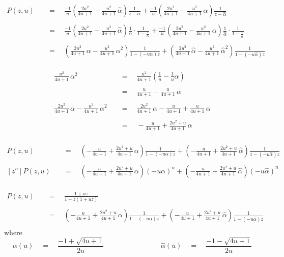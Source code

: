 \documentclass[twoside]{article}
\newcommand{\equals}{\ensuremath{\quad =\quad}}
\newcommand{\fourqquad}{\ensuremath{\qquad\qquad\qquad\qquad}}
\newcommand{\alphahat}{\ensuremath{\hat{\alpha}}}
\begin{document}
\begin{align*}
P(z,u)	& \equals \frac{-1}{u}\left(\frac{2u^2}{4u+1}-\frac{u^2}{4u+1}\,\alphahat\right)\frac{1}{z-\alpha}
                  +\frac{-1}{u}\left(\frac{2u^2}{4u+1}-\frac{u^2}{4u+1}\,\alpha\right)\frac{1}{z-\alphahat}				\\
																	\\
	& \equals \frac{-1}{u}\left(\frac{2u^2}{4u+1}-\frac{u^2}{4u+1}\,\alphahat\right)\frac{1}{\alpha}
                  \cdot \frac{1}{1-\frac{z}{\alpha}}
                  +\frac{-1}{u}\left(\frac{2u^2}{4u+1}-\frac{u^2}{4u+1}\,\alpha\right)\frac{1}{\alphahat}
                  \cdot \frac{1}{1-\frac{z}{\alphahat}}											\\
																	\\
	& \equals \left(\frac{2u^2}{4u+1}\,\alpha-\frac{u^2}{4u+1}\,\alpha^2\right) \frac{1}{1-(-u\alpha)z}
                  +\left(\frac{2u^2}{4u+1}\,\alphahat-\frac{u^2}{4u+1}\,\alphahat^2\right) \frac{1}{1-(-u\alphahat)z}		\\
\end{align*}

\begin{align*}
\frac{u^2}{4u+1}\,\alpha^2				& \equals \frac{u^2}{4u+1}\left(\frac{1}{u}-\frac{1}{u}\alpha\right)		\\
																	\\
							& \equals \frac{u}{4u+1}-\frac{u}{4u+1}\,\alpha					\\
																	\\
\frac{2u^2}{4u+1}\,\alpha-\frac{u^2}{4u+1}\,\alpha^2	& \equals \frac{2u^2}{4u+1}\,\alpha-\frac{u}{4u+1}+\frac{u}{4u+1}\,\alpha	\\
																	\\
							& \equals -\frac{u}{4u+1}+\frac{2u^2+u}{4u+1}\,\alpha				\\
\end{align*}

\begin{align*}
P(z,u)	& \equals \left(-\frac{u}{4u+1}+\frac{2u^2+u}{4u+1}\,\alpha\right) \frac{1}{1-(-u\alpha)z}
                  +\left(-\frac{u}{4u+1}+\frac{2u^2+u}{4u+1}\,\alphahat\right) \frac{1}{1-(-u\alphahat)z}		\\
															\\
[z^n]P(z,u)	& \equals \left(-\frac{u}{4u+1}+\frac{2u^2+u}{4u+1}\,\alpha\right)(-u\alpha)^n
                  +\left(-\frac{u}{4u+1}+\frac{2u^2+u}{4u+1}\,\alphahat\right)(-u\alphahat)^n				\\
\end{align*}

\begin{align*}
P(z,u)	& \equals \frac{1+uz}{1-z(1+uz)}										\\
															\\
	& \equals \left(-\frac{u}{4u+1}+\frac{2u^2+u}{4u+1}\,\alpha\right) \frac{1}{1-(-u\alpha)z}
                  +\left(-\frac{u}{4u+1}+\frac{2u^2+u}{4u+1}\,\alphahat\right) \frac{1}{1-(-u\alphahat)z}		\\
\end{align*}
where
$$ \alpha(u) \equals \frac{-1+\sqrt{4u+1}}{2u} \fourqquad \alphahat(u) \equals \frac{-1-\sqrt{4u+1}}{2u} $$
\end{document}
